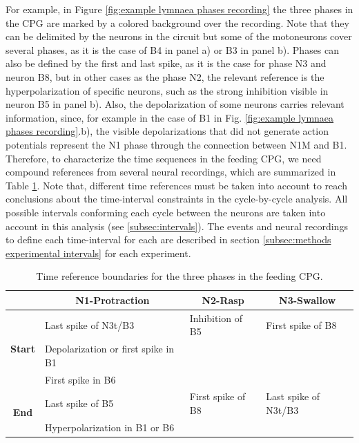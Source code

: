 For example, in Figure \ref{fig:example lymnaea phases recording} the three phases in the CPG are marked by a colored background over the recording. Note that they can be delimited by the neurons in the circuit but some of the motoneurons cover several phases, as it is the case of B4 in panel a) or B3 in panel b). Phases can also be defined by the first and last spike, as it is the case for phase N3 and neuron B8, but in other cases as the phase N2, the relevant reference is the hyperpolarization of specific neurons, such as the strong inhibition visible in neuron B5 in panel b). Also, the depolarization of some neurons carries relevant information, since, for example in the case of B1 in Fig. \ref{fig:example lymnaea phases recording}.b), the visible depolarizations that did not generate action potentials represent the N1 phase through the connection between N1M and B1. Therefore, to characterize the time sequences in the feeding CPG, we need compound references from several neural recordings, which are summarized in Table \ref{table:cpg ref intervals}. Note that, different time references must be taken into account to reach conclusions about the time-interval constraints in the cycle-by-cycle analysis. All possible intervals conforming each cycle between the neurons are taken into account in this analysis (see \ref{subsec:intervals}). The events and neural recordings to define each time-interval for each are described in section \ref{subsec:methods experimental intervals} for each experiment.


\begin{table}[htb!]
	\centering
	\begin{tabular}{cl|l|l}
			\multicolumn{1}{l}{}                                 & \multicolumn{1}{c|}{\textbf{N1-Protraction}} & \multicolumn{1}{c|}{\textbf{N2-Rasp}} & \multicolumn{1}{c}{\textbf{N3-Swallow}} \\ \hline
			\multicolumn{1}{c|}{\multirow{3}{*}{\textbf{Start}}} & Last spike of N3t/B3                         & Inhibition of B5                      & First spike of B8                       \\
			\multicolumn{1}{c|}{}                                & Depolarization or first spike in B1          &                                       &                                         \\
			\multicolumn{1}{c|}{}                                & First spike in B6                            &                                       &                                         \\ \hline
			\multicolumn{1}{c|}{\multirow{2}{*}{\textbf{End}}}   & Last spike of B5                             & First spike of B8                     & Last spike of N3t/B3                    \\
			\multicolumn{1}{c|}{}                                & Hyperpolarization in B1 or B6                &                                       &                                        
		\end{tabular}
	\caption{Time reference boundaries for the three phases in the feeding CPG.}
	\label{table:cpg ref intervals}
\end{table}

